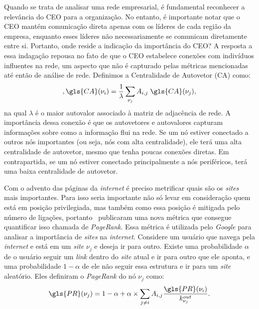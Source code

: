 Quando se trata de analisar uma rede empresarial, é fundamental reconhecer a relevância do CEO para a organização. No entanto, é importante notar que o CEO mantém comunicação direta apenas com os líderes de cada região da empresa, enquanto esses líderes não necessariamente se comunicam diretamente entre si. Portanto, onde reside a indicação da importância do CEO? A resposta a essa indagação repousa no fato de que o CEO estabelece conexões com indivíduos influentes na rede, um aspecto que não é capturado pelas métricas 
mencionadas até então
de análise de rede. Definimos a Centralidade de Autovetor (\gls{CA}) como:
\begin{equation},
  \gls{CA}(\nu_i) = \frac{1}{\lambda}\sum_{\nu_j}A_{i,j}\; \gls{CA}(\nu_j),
\end{equation}
na qual $\lambda$ é o maior autovalor associado à matriz de adjacência de rede. A importância dessa conexão é que os autovetores e autovalores capturam informações sobre como a informação flui na rede. Se um nó estiver conectado a outros nós importantes (ou seja, nós com alta centralidade), ele terá uma alta centralidade de autovetor, mesmo que tenha poucas conexões diretas. Em contrapartida, se um nó estiver conectado principalmente a nós periféricos, terá uma baixa centralidade de autovetor.

Com o advento das páginas da \textit{internet} é preciso metrificar quais são os \textit{sites} mais importantes. Para isso seria importante não só levar em consideração quem está em posição privilegiada, mas também como essa posição é mitigada pelo número de ligações, portanto~\cite{page1999pagerank} publicaram uma nova métrica que consegue quantificar isso chamada de \textit{PageRank}. Essa métrica é utilizada pelo \textit{Google} para analisar a importância de \textit{sites} na \textit{internet}. Considere um usuário que navega pela \textit{internet} e está em um \textit{site} $\nu_j$ e deseja ir para outro. Existe uma probabilidade $\alpha$ de o usuário seguir um \textit{link} dentro do \textit{site} atual e ir para outro que ele aponta, e uma probabilidade $1 - \alpha$ de ele não seguir essa estrutura e ir para um \textit{site} aleatório. Eles definiram o \textit{PageRank} do nó $\nu_j$ como:
\begin{equation}
  \gls{PR}(\nu_j) =1 - \alpha + \alpha\times \sum_{j \neq i} A_{i,j}\frac{\gls{PR}(\nu_i)}{k^{out}_{\nu_j}}.
\end{equation}

